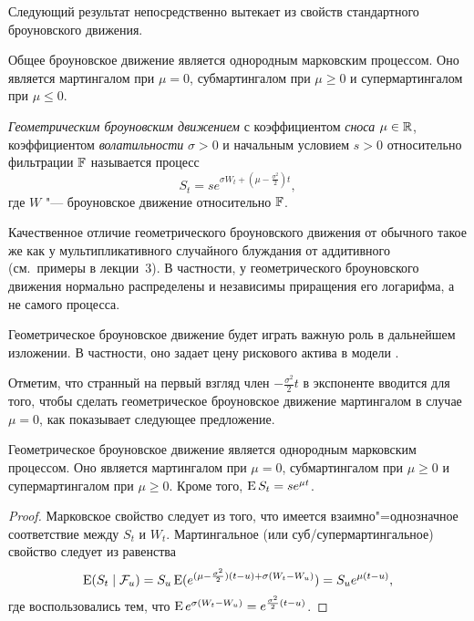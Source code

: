 Следующий результат непосредственно вытекает из свойств стандартного броуновского движения.

\begin{proposition}
Общее броуновское движение является однородным марковским процессом.
Оно является мартингалом при $\mu=0$, субмартингалом при $\mu\ge0$ и супермартингалом при $\mu\le0$.
\end{proposition}

\begin{definition}
\emph{Геометрическим броуновским движением} с коэффициентом \emph{сноса} $\mu\in\mathbb{R}$, коэффициентом \emph{волатильности} $\sigma>0$ и начальным условием $s>0$ относительно фильтрации $\mathbb{F}$ называется процесс
\[
S_t = s e^{\sigma W_t + (\mu-\frac{\sigma^2}{2})t},
\]
где $W$ "--- броуновское движение относительно $\mathbb{F}$.
\end{definition}

Качественное отличие геометрического броуновского движения от обычного такое же как у мультипликативного случайного блуждания от аддитивного (см.~примеры в лекции~3).
В частности, у геометрического броуновского движения нормально распределены и независимы приращения его логарифма, а не самого процесса. 

Геометрическое броуновское движение будет играть важную роль в дальнейшем изложении.
В частности, оно задает цену рискового актива в модели \bs.

Отметим, что странный на первый взгляд член $-\frac{\sigma^2}{2}t$ в экспоненте вводится для того, чтобы сделать геометрическое броуновское движение мартингалом в случае $\mu=0$, как показывает следующее предложение.

\begin{proposition}
Геометрическое броуновское движение является однородным марковским процессом.
Оно является мартингалом при $\mu=0$, субмартингалом при $\mu\ge0$ и супермартингалом при $\mu\ge0$.
Кроме того, $\operatorname{E} S_t = s e^{\mu t}$.
\end{proposition}

\begin{proof}
Марковское свойство следует из того, что имеется взаимно"=однозначное соответствие между $S_t$ и $W_t$.
Мартингальное (или суб/супермартингальное) свойство следует из равенства
\[
\operatorname{E} (S_t \mid \mathcal{F}_u) = S_u \operatorname{E}(e^{(\mu-\frac{\sigma^2}{2})(t-u) + \sigma(W_t-W_u)}) = S_u e^{\mu(t-u)},
\]
где воспользовались тем, что $\operatorname{E} e^{\sigma (W_t-W_u)} = e^{\frac{\sigma^2}{2} (t-u)}$.
\end{proof}


